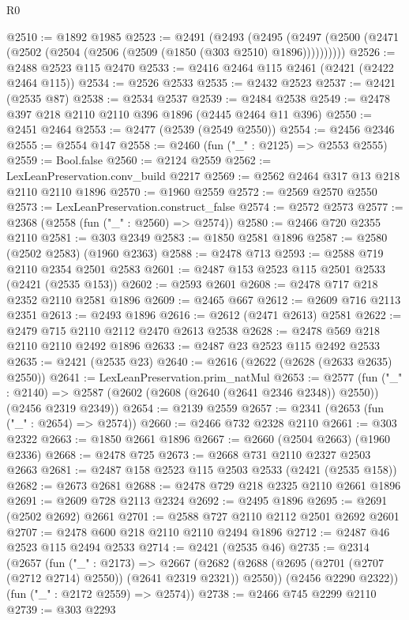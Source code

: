 \begin{lexlean}{R0}
\begin{coremodule}
@2510 := @1892 @1985
@2523 := @2491
    (@2493
      (@2495 (@2497 (@2500 (@2471 (@2502 (@2504 (@2506 (@2509 (@1850 (@303 @2510) @1896))))))))))
@2526 := @2488 @2523 @115 @2470
@2533 := @2416 @2464 @115 @2461 (@2421 (@2422 @2464 @115))
@2534 := @2526 @2533
@2535 := @2432 @2523
@2537 := @2421 (@2535 @87)
@2538 := @2534 @2537
@2539 := @2484 @2538
@2549 := @2478 @397 @218 @2110 @2110 @396 @1896 (@2445 @2464 @11 @396)
@2550 := @2451 @2464
@2553 := @2477 (@2539 (@2549 @2550))
@2554 := @2456 @2346
@2555 := @2554 @147
@2558 := @2460 (fun ("_" : @2125) => @2553 @2555)
@2559 := Bool.false
@2560 := @2124 @2559
@2562 := LexLeanPreservation.conv_build @2217
@2569 := @2562 @2464 @317 @13 @218 @2110 @2110 @1896
@2570 := @1960 @2559
@2572 := @2569 @2570 @2550
@2573 := LexLeanPreservation.construct_false
@2574 := @2572 @2573
@2577 := @2368 (@2558 (fun ("_" : @2560) => @2574))
@2580 := @2466 @720 @2355 @2110
@2581 := @303 @2349
@2583 := @1850 @2581 @1896
@2587 := @2580 (@2502 @2583) (@1960 @2363)
@2588 := @2478 @713
@2593 := @2588 @719 @2110 @2354 @2501 @2583
@2601 := @2487 @153 @2523 @115 @2501 @2533 (@2421 (@2535 @153))
@2602 := @2593 @2601
@2608 := @2478 @717 @218 @2352 @2110 @2581 @1896
@2609 := @2465 @667
@2612 := @2609 @716 @2113 @2351
@2613 := @2493 @1896
@2616 := @2612 (@2471 @2613) @2581
@2622 := @2479 @715 @2110 @2112 @2470 @2613 @2538
@2628 := @2478 @569 @218 @2110 @2110 @2492 @1896
@2633 := @2487 @23 @2523 @115 @2492 @2533
@2635 := @2421 (@2535 @23)
@2640 := @2616 (@2622 (@2628 (@2633 @2635) @2550))
@2641 := LexLeanPreservation.prim_natMul
@2653 := @2577
    (fun ("_" : @2140) =>
    @2587 (@2602 (@2608 (@2640 (@2641 @2346 @2348)) @2550)) (@2456 @2319 @2349))
@2654 := @2139 @2559
@2657 := @2341 (@2653 (fun ("_" : @2654) => @2574))
@2660 := @2466 @732 @2328 @2110
@2661 := @303 @2322
@2663 := @1850 @2661 @1896
@2667 := @2660 (@2504 @2663) (@1960 @2336)
@2668 := @2478 @725
@2673 := @2668 @731 @2110 @2327 @2503 @2663
@2681 := @2487 @158 @2523 @115 @2503 @2533 (@2421 (@2535 @158))
@2682 := @2673 @2681
@2688 := @2478 @729 @218 @2325 @2110 @2661 @1896
@2691 := @2609 @728 @2113 @2324
@2692 := @2495 @1896
@2695 := @2691 (@2502 @2692) @2661
@2701 := @2588 @727 @2110 @2112 @2501 @2692 @2601
@2707 := @2478 @600 @218 @2110 @2110 @2494 @1896
@2712 := @2487 @46 @2523 @115 @2494 @2533
@2714 := @2421 (@2535 @46)
@2735 := @2314
    (@2657
      (fun ("_" : @2173) =>
      @2667
        (@2682 (@2688 (@2695 (@2701 (@2707 (@2712 @2714) @2550)) (@2641 @2319 @2321)) @2550))
        (@2456 @2290 @2322))
      (fun ("_" : @2172 @2559) => @2574))
@2738 := @2466 @745 @2299 @2110
@2739 := @303 @2293

\end{coremodule}
\end{lexlean}
